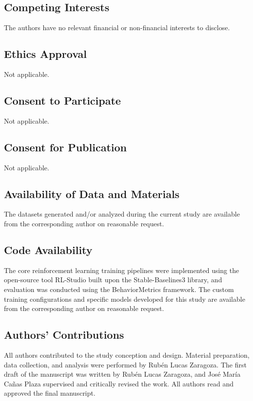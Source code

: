 \documentclass[sn-mathphys,Numbered]{sn-jnl}
\begin{document}
\subsection*{Competing Interests}
The authors have no relevant financial or non-financial interests to disclose.

\subsection*{Ethics Approval}
Not applicable.

\subsection*{Consent to Participate}
Not applicable.

\subsection*{Consent for Publication}
Not applicable.

\subsection*{Availability of Data and Materials}
The datasets generated and/or analyzed during the current study are available from the corresponding author on reasonable request.

\subsection*{Code Availability}
The core reinforcement learning training pipelines were implemented using the open-source tool RL-Studio built upon the Stable-Baselines3 library, and evaluation was conducted using the BehaviorMetrics framework. The custom training configurations and specific models developed for this study are available from the corresponding author on reasonable request.

\subsection*{Authors' Contributions}
All authors contributed to the study conception and design. Material preparation, data collection, and analysis were performed by Rub\'en Lucas Zaragoza. The first draft of the manuscript was written by Rub\'en Lucas Zaragoza, and Jos\'e Mar\'ia Ca\~nas Plaza supervised and critically revised the work. All authors read and approved the final manuscript.


\end{document}
